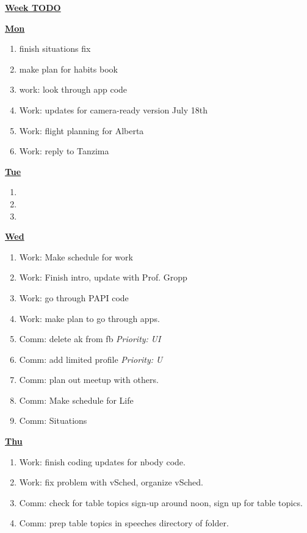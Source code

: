 \documentclass[serif,mathserif,final]{beamer}
\newcommand{\priority}[1]{\textit{Priority:} \textit{#1}}
\begin{document}
\begin{frame}{}
\begin{columns}[t]
\begin{column}{0.33\linewidth}{\textbf{\underline{Week TODO}}}
\begin{block}
\textbf{\underline{Mon}}
\begin{enumerate} 
\tiny \item \tiny finish situations fix 
\item \tiny make plan for habits book  
\item \tiny work: look through app code 
\item \tiny Work: updates for camera-ready version July 18th 
\item \tiny Work: flight planning for Alberta 
\item \tiny Work: reply to Tanzima 
\end{enumerate} 


\textbf{\underline{Tue}}
\begin{enumerate} 
\tiny \item \tiny 
\item \tiny 
\item \tiny 
\end{enumerate} 


\textbf{\underline{Wed}}
\begin{enumerate} 
\item \tiny Work: Make schedule for work 
\item \tiny Work: Finish intro, update with Prof. Gropp 
\item \tiny Work: go through PAPI code 
\item \tiny Work: make plan to go through apps. 

\item \tiny Comm: delete ak from fb \priority{UI}  
\item \tiny Comm: add limited profile \priority{U} 

\item \tiny Comm: plan out meetup with others. 
\item \tiny Comm: Make schedule for Life 
\item \tiny Comm: Situations 

\end{enumerate} 

\textbf{\underline{Thu}}
\begin{enumerate} 
\tiny \item \tiny Work: finish coding updates for nbody code. 
\item \tiny Work: fix problem with vSched, organize vSched. 

\item \tiny Comm: check for table topics sign-up around noon, sign up for table topics. 
\item \tiny Comm: prep table topics in speeches directory of folder. 


\end{enumerate}
\end{block}
\end{column}
\end{columns}
\end{frame}
\end{document}
